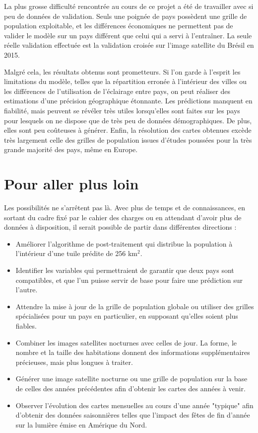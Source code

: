 \documentclass[a4paper, 11pt]{report}
\begin{document}
La plus grosse difficulté rencontrée au cours de ce projet a été de travailler avec si peu de données de validation. Seuls une poignée de pays possèdent une grille de population exploitable, et les différences économiques ne permettent pas de valider le modèle sur un pays différent que celui qui a servi à l'entraîner. La seule réelle validation effectuée est la validation croisée sur l'image satellite du Brésil en 2015.

Malgré cela, les résultats obtenus sont prometteurs. Si l'on garde à l'esprit les limitations du modèle, telles que la répartition erronée à l'intérieur des villes ou les différences de l'utilisation de l'éclairage entre pays, on peut réaliser des estimations d'une précision géographique étonnante. Les prédictions manquent en fiabilité, mais peuvent se révéler très utiles lorsqu'elles sont faites sur les pays pour lesquels on ne dispose que de très peu de données démographiques. De plus, elles sont peu coûteuses à générer. Enfin, la résolution des cartes obtenues excède très largement celle des grilles de population issues d'études poussées pour la très grande majorité des pays, même en Europe.

\section{Pour aller plus loin}

Les possibilités ne s'arrêtent pas là. Avec plus de temps et de connaissances, en sortant du cadre fixé par le cahier des charges ou en attendant d'avoir plus de données à disposition, il serait possible de partir dans différentes directions :

\begin{itemize}
	\item Améliorer l'algorithme de post-traitement qui distribue la population à l'intérieur d'une tuile prédite de 256 km$^2$.
	\item Identifier les variables qui permettraient de garantir que deux pays sont compatibles, et que l'un puisse servir de base pour faire une prédiction sur l'autre.
	\item Attendre la mise à jour de la grille de population globale ou utiliser des grilles spécialisées pour un pays en particulier, en supposant qu'elles soient plus fiables.
	\item Combiner les images satellites nocturnes avec celles de jour. La forme, le nombre et la taille des habitations donnent des informations supplémentaires précieuses, mais plus longues à traiter.
	\item Générer une image satellite nocturne ou une grille de population sur la base de celles des années précédentes afin d'obtenir les cartes des années à venir.
	\item Observer l'évolution des cartes mensuelles au cours d'une année "typique" afin d'obtenir des données saisonnières telles que l'impact des fêtes de fin d'année sur la lumière émise en Amérique du Nord.
\end{itemize}
\end{document}
